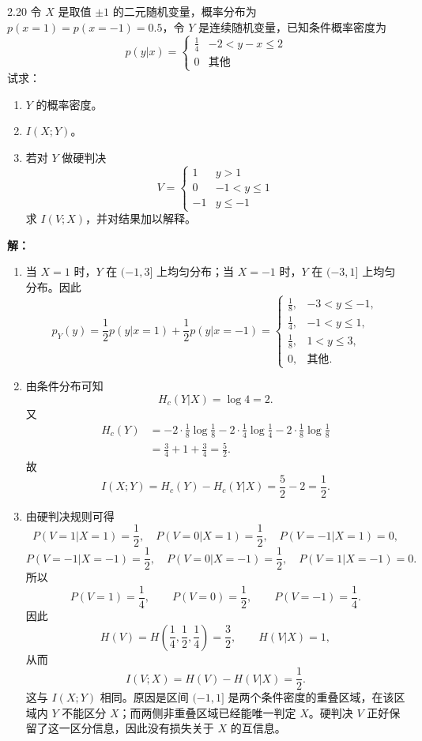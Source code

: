 \documentclass[UTF8,11pt,a4paper]{ctexart}
\begin{document}
\begin{problem}{2.20}
令 $X$ 是取值 $\pm 1$ 的二元随机变量，概率分布为 $p(x=1)=p(x=-1)=0.5$，令 $Y$ 是连续随机变量，已知条件概率密度为
\[
p(y|x) =
\begin{cases}
\frac{1}{4} & -2 < y - x \leq 2 \\
0 & \text{其他}
\end{cases}
\]
试求：

\begin{enumerate}[label=\textnormal{(\alph*)}]
  \item $Y$ 的概率密度。

  \item $I(X;Y)$。

  \item 若对 $Y$ 做硬判决
  \[
  V =
  \begin{cases}
  1 & y > 1 \\
  0 & -1 < y \leq 1 \\
  -1 & y \leq -1
  \end{cases}
  \]
  求 $I(V;X)$，并对结果加以解释。
\end{enumerate}
\end{problem}
\noindent\textbf{解：}
\begin{enumerate}[label=\textnormal{(\alph*)}]
  \item 当 $X=1$ 时，$Y$ 在 $(-1,3]$ 上均匀分布；当 $X=-1$ 时，$Y$ 在 $(-3,1]$ 上均匀分布。因此
  \[
  p_Y(y)=\frac12p(y|x=1)+\frac12p(y|x=-1)
  =
  \begin{cases}
  \frac18, & -3<y\le -1,\\
  \frac14, & -1<y\le 1,\\
  \frac18, & 1<y\le 3,\\
  0, & \text{其他}.
  \end{cases}
  \]

  \item 由条件分布可知
  \[
  H_c(Y|X)=\log 4=2.
  \]
  又
  \[
  \begin{aligned}
  H_c(Y)
  &=-2\cdot\frac18\log\frac18
    -2\cdot\frac14\log\frac14
    -2\cdot\frac18\log\frac18\\
  &=\frac34+1+\frac34
  =\frac52.
  \end{aligned}
  \]
  故
  \[
  I(X;Y)=H_c(Y)-H_c(Y|X)=\frac52-2=\frac12.
  \]

  \item 由硬判决规则可得
  \[
  P(V=1|X=1)=\frac12,\quad P(V=0|X=1)=\frac12,\quad P(V=-1|X=1)=0,
  \]
  \[
  P(V=-1|X=-1)=\frac12,\quad P(V=0|X=-1)=\frac12,\quad P(V=1|X=-1)=0.
  \]
  所以
  \[
  P(V=1)=\frac14,\qquad P(V=0)=\frac12,\qquad P(V=-1)=\frac14.
  \]
  因此
  \[
  H(V)=H\!\left(\frac14,\frac12,\frac14\right)=\frac32,\qquad H(V|X)=1,
  \]
  从而
  \[
  I(V;X)=H(V)-H(V|X)=\frac12.
  \]
  这与 $I(X;Y)$ 相同。原因是区间 $(-1,1]$ 是两个条件密度的重叠区域，在该区域内 $Y$ 不能区分 $X$；而两侧非重叠区域已经能唯一判定 $X$。硬判决 $V$ 正好保留了这一区分信息，因此没有损失关于 $X$ 的互信息。
\end{enumerate}
\end{document}

